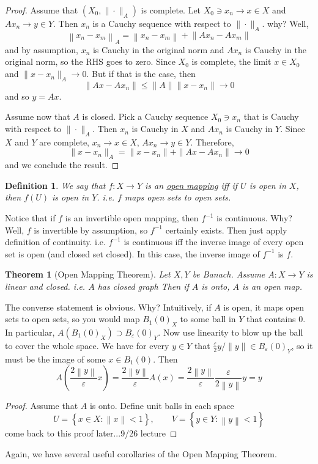 \documentclass[letterpaper,twoside,11pt]{article}
\theoremstyle{mystyle}
\newtheorem*{thm}{Theorem}		%
\newtheorem{definition}{Definition}[section]
\newcommand{\cg}{\color{gray}}
\newcommand{\cbk}{\color{black}}
\newcommand{\cred}{\color{red}}
\begin{document}
\begin{proof}
  Assume that $(X_0, \|\cdot\|_A)$ is complete. Let $X_0 \ni x_n \to x \in X$ and $Ax_n \to y \in Y$. Then $x_n$ is a Cauchy sequence with respect to $\|\cdot \|_A$. \cg why? Well, \[{\left\| {{x_n} - {x_m}} \right\|_A} = \left\| {{x_n} - {x_m}} \right\| + \left\| {A{x_n} - A{x_m}} \right\|\] and by assumption, $x_n$ is Cauchy in the original norm and $Ax_n$ is Cauchy in the original norm, so the RHS goes to zero. \cbk Since $X_0$ is complete, the limit $x\in X_0$ and $\|x-x_n\|_A \to 0$. But if that is the case, then \[\|Ax-Ax_n\|\leq \|A\|\|x-x_n\|\to 0\] and so $y=Ax$. 

  Assume now that $A$ is closed. Pick a Cauchy sequence $X_0 \ni x_n$ that is Cauchy with respect to $\|\cdot \|_A$. Then $x_n$ is Cauchy in $X$ and $Ax_n$ is Cauchy in $Y$. Since $X$ and $Y$ are complete, $x_n\to x \in X$, $Ax_n \to y \in Y$. Therefore, \[\|x-x_n\|_A = \|x-x_n\| + \|Ax-Ax_n\| \to 0\] and we conclude the result. 
\end{proof}

\begin{definition}
  We say that $f:X\to Y$ is an \underline{open mapping} iff if $U$ is open in $X$, then $f(U)$ is open in $Y$. \cg i.e. $f$ maps open sets to open sets. \cbk 
\end{definition}
Notice that if $f$ is an invertible open mapping, then $f^{-1}$ is continuous. Why? Well, $f$ is invertible by assumption, so $f^{-1}$ certainly exists. Then just apply definition of continuity. \cg i.e. $f^{-1}$ is continuous iff the inverse image of every open set is open (and closed set closed). In this case, the inverse image of $f^{-1}$ is $f$. \cbk
\begin{tcolorbox}[colback=red!5!white,colframe=red!75!black]
\begin{thm}[Open Mapping Theorem]
  Let $X,Y$ be Banach. Assume $A:X\to Y$ is linear and closed. \cg i.e. $A$ has closed graph \cbk Then if $A$ is onto, $A$ is an open map. 
\end{thm}
\end{tcolorbox}
The converse statement is obvious. \cg Why? Intuitively, if $A$ is open, it maps open sets to open sets, so you would map $B_1(0)_X$ to some ball in $Y$ that contains $0$. In particular, $A(B_1(0)_X)\supset B_\varepsilon(0)_Y$. Now use linearity to blow up the ball to cover the whole space. We have for every $y\in Y$ that $\frac{\varepsilon}{2}y/\|y\| \in B_\varepsilon(0)_Y$, so it must be the image of some $x \in B_1(0)$. Then 
\[A\left( {\frac{{2\left\| y \right\|}}{\varepsilon }x} \right) = \frac{{2\left\| y \right\|}}{\varepsilon }A\left( x \right) = \frac{{2\left\| y \right\|}}{\varepsilon }\frac{\varepsilon }{{2\left\| y \right\|}}y = y\]\cbk
\begin{proof}
  Assume that $A$ is onto. Define unit balls in each space 
  \[U = \left\{ {x \in X:\left\| x \right\| < 1} \right\},\qquad V = \left\{ {y \in Y:\left\| y \right\| < 1} \right\}\]
  \cred come back to this proof later...9/26 lecture\cbk 
\end{proof}
Again, we have several useful corollaries of the Open Mapping Theorem. 
\end{document}
